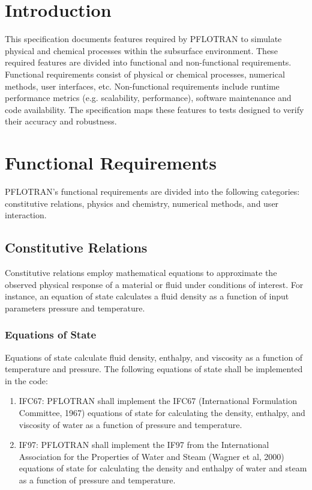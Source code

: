 \section{Introduction}
This specification documents features required by PFLOTRAN to simulate physical and chemical processes within the subsurface environment. These required features are divided into functional and non-functional requirements. Functional requirements consist of physical or chemical processes, numerical methods, user interfaces, etc.  Non-functional requirements include runtime performance metrics (e.g. scalability,  performance), software maintenance and code availability. The specification maps these features to tests designed to verify their accuracy and robustness.

\section{Functional Requirements}
PFLOTRAN’s functional requirements are divided into the following categories: constitutive relations, physics and chemistry, numerical methods, and user interaction.
\subsection{Constitutive Relations}

Constitutive relations employ mathematical equations to approximate the observed physical response of a material or fluid under conditions of interest. For instance, an equation of state calculates a fluid density as a function of input parameters pressure and temperature.

\subsubsection{Equations of State}
Equations of state calculate fluid density, enthalpy, and viscosity as a function of temperature and pressure. The following equations of state shall be implemented in the code:
\begin{enumerate}[label=CR \arabic*.,ref=CR \arabic*,nosep]
	\item IFC67: \label{ifc67} PFLOTRAN shall implement the IFC67 (International Formulation Committee, 1967) equations of state for calculating the density, enthalpy, and viscosity of water as a function of pressure and temperature.
	\item IF97: \label{if97} PFLOTRAN shall implement the IF97 from the International Association for the Properties of Water and Steam (Wagner et al, 2000) equations of state for calculating the density and enthalpy of water and steam as a function of pressure and temperature.
\end{enumerate}

